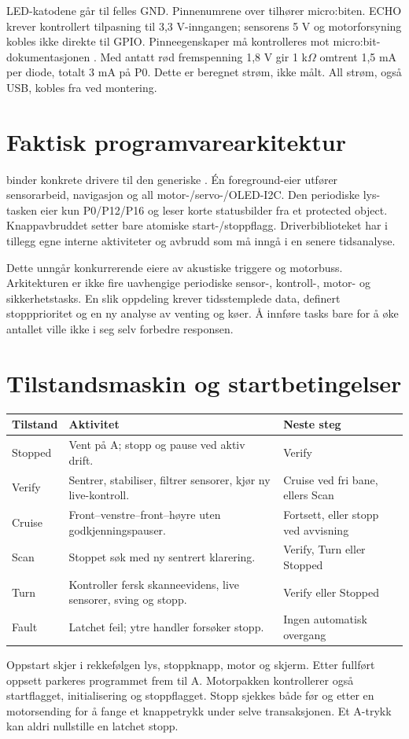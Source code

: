 LED-katodene går til felles GND. Pinnenumrene over tilhører micro:biten.
ECHO krever kontrollert tilpasning til 3,3 V-inngangen; sensorens 5 V og
motorforsyning kobles ikke direkte til GPIO. Pinneegenskaper må kontrolleres
mot micro:bit-dokumentasjonen \cite{pins}. Med antatt rød fremspenning
1,8 V gir 1 k$\Omega$ omtrent 1,5 mA per diode, totalt 3 mA på P0.
Dette er beregnet strøm, ikke målt. All strøm, også USB, kobles fra ved montering.

\section{Faktisk programvarearkitektur}
 binder konkrete drivere til den generiske
. Én foreground-eier utfører sensorarbeid,
navigasjon og all motor-/servo-/OLED-I2C. Den periodiske lys-tasken eier
kun P0/P12/P16 og leser korte statusbilder fra et protected object.
Knappavbruddet setter bare atomiske start-/stoppflagg. Driverbiblioteket
har i tillegg egne interne aktiviteter og avbrudd som må inngå i en senere
tidsanalyse.

Dette unngår konkurrerende eiere av akustiske triggere og motorbuss.
Arkitekturen er ikke fire uavhengige periodiske sensor-, kontroll-, motor-
og sikkerhetstasks. En slik oppdeling krever tidsstemplede data, definert
stoppprioritet og en ny analyse av venting og køer. Å innføre tasks bare
for å øke antallet ville ikke i seg selv forbedre responsen.

\section{Tilstandsmaskin og startbetingelser}
\begin{tabularx}{\textwidth}{@{}P{20mm}Y Y@{}}\toprule
Tilstand & Aktivitet & Neste steg\\\midrule
Stopped & Vent på A; stopp og pause ved aktiv drift. & Verify\\
Verify & Sentrer, stabiliser, filtrer sensorer, kjør ny live-kontroll. & Cruise ved fri bane, ellers Scan\\
Cruise & Front--venstre--front--høyre uten godkjenningspauser. & Fortsett, eller stopp ved avvisning\\
Scan & Stoppet søk med ny sentrert klarering. & Verify, Turn eller Stopped\\
Turn & Kontroller fersk skanneevidens, live sensorer, sving og stopp. & Verify eller Stopped\\
Fault & Latchet feil; ytre handler forsøker stopp. & Ingen automatisk overgang\\\bottomrule
\end{tabularx}

Oppstart skjer i rekkefølgen lys, stoppknapp, motor og skjerm. Etter fullført
oppsett parkeres programmet frem til A. Motorpakken kontrollerer også
startflagget, initialisering og stoppflagget. Stopp sjekkes både før og
etter en motorsending for å fange et knappetrykk under selve transaksjonen.
Et A-trykk kan aldri nullstille en latchet stopp.
